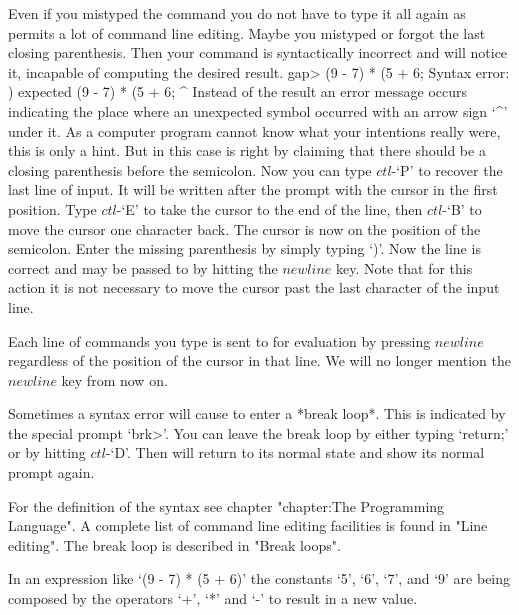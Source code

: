 Even if you mistyped the command you do not have to  type it all again as
{\GAP}  permits a lot of  command  line editing.   Maybe you mistyped  or
forgot the last closing parenthesis.  Then  your command is syntactically
incorrect and  {\GAP} will  notice it, incapable of computing the desired
result.
\beginexample
    gap> (9 - 7) * (5 + 6;
    Syntax error: ) expected
    (9 - 7) * (5 + 6;
                    ^
\endexample
Instead of the result an error message occurs  indicating the place where
an unexpected  symbol  occurred with  an arrow sign `^' under  it.  As a
computer program cannot know  what  your  intentions really were, this is
only a hint.  But  in this  case {\GAP} is right  by  claiming that there
should be a closing  parenthesis before the semicolon.  Now  you can type
$ctl$-`P' to  recover the last line of  input.  It  will be written after
the prompt with the cursor in the first position.  Type $ctl$-`E' to take
the cursor  to the end of the line, then $ctl$-`B' to move the cursor one
character  back.  The  cursor  is  now  on the position of the semicolon.
Enter  the missing  parenthesis  by simply typing `)'.  Now  the  line is
correct and may be passed to {\GAP} by  hitting  the $newline$ key.  Note
that for this action it is not necessary to move the cursor past the last
character of the input line.

Each  line  of commands you  type  is  sent to  {\GAP} for  evaluation by
pressing $newline$ regardless of the position of the cursor in that line.
We will no longer mention the $newline$ key from now on.

Sometimes a syntax error will cause {\GAP} to enter a *break loop*.  This
is indicated by the special prompt `brk>'.  You can leave  the break loop
by either typing `return;'  or  by hitting  $ctl$-`D'.  Then  {\GAP} will
return to its normal state and show its normal prompt again.

For the  definition  of the    {\GAP}  syntax see  chapter   "chapter:The
Programming Language". A complete list of command line editing facilities
is found in "Line editing". The break loop is described in "Break loops".

\null

%
In an  expression like `(9  - 7) * (5 +  6)' the constants `5', `6', `7',
and `9' are being composed by the operators `+', `*' and `-' to result in
a new value.

